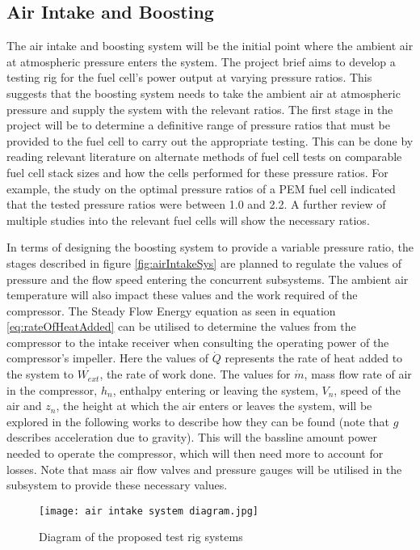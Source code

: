 \documentclass[a4paper,11pt]{article}
\begin{document}
\subsection{Air Intake and Boosting}
The air intake and boosting system will be the initial point where the ambient air at atmospheric pressure enters the system. The project brief aims to develop a testing rig for the fuel cell's power output at varying pressure ratios. This suggests that the boosting system needs to take the ambient air at atmospheric pressure and supply the system with the relevant ratios. The first stage in the project will be to determine a definitive range of pressure ratios that must be provided to the fuel cell to carry out the appropriate testing. This can be done by reading relevant literature on alternate methods of fuel cell tests on comparable fuel cell stack sizes and how the cells performed for these pressure ratios. For example, the study on the optimal pressure ratios of a PEM fuel cell\cite{hoeflinger2020air} indicated that the tested pressure ratios were between 1.0 and 2.2. A further review of multiple studies into the relevant fuel cells will show the necessary ratios.

In terms of designing the boosting system to provide a variable pressure ratio, the stages described in figure \ref{fig:airIntakeSys} are planned to regulate the values of pressure and the flow speed entering the concurrent subsystems. The ambient air temperature will also impact these values and the work required of the compressor. The Steady Flow Energy equation as seen in equation \ref{eq:rateOfHeatAdded} can be utilised to determine the values from the compressor to the intake receiver when consulting the operating power of the compressor's impeller. Here the values of $\dot{Q}$ represents the rate of heat added to the system to $\dot{W_{ext}}$, the rate of work done. The values for $\dot{m}$, mass flow rate of air in the compressor, $h_n$, enthalpy entering or leaving the system, $V_n$, speed of the air and $z_n$, the height at which the air enters or leaves the system, will be explored in the following works to describe how they can be found (note that $g$ describes acceleration due to gravity). This will the bassline amount power needed to operate the compressor, which will then need more to account for losses. Note that mass air flow valves and pressure gauges will be utilised in the subsystem to provide these necessary values. 

\begin{figure}[h]
    \texttt{[image: air intake system diagram.jpg]}
    \caption{Diagram of the proposed test rig systems}
    \centering  
\end{figure}\label{fig:airIntakeSys}
\end{document}

